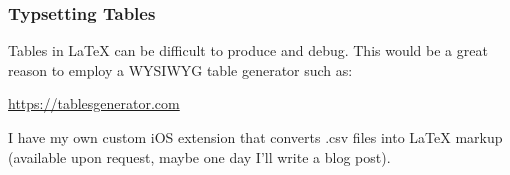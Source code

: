 \begin{center}
\begin{latexcode}
\sin \csc
\cos \sec
\tan \cot
\end{latexcode}
\end{center}

\subsubsection{Typsetting Tables}
Tables in \LaTeX{} can be difficult to produce and debug. This would be a great reason to employ a WYSIWYG table generator such as:
\begin{center}
	\url{https://tablesgenerator.com}
\end{center}

I have my own custom iOS extension that converts .csv files into \LaTeX{} markup (available upon request, maybe one day I'll write a blog post). 








